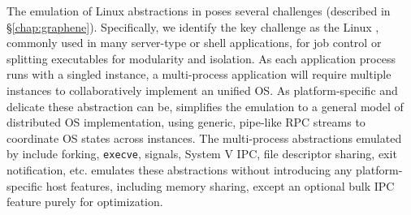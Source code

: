 %



The emulation of Linux abstractions in \graphene{}
poses several challenges (described in \S\ref{chap:graphene}).
Specifically, we identify the key challenge as the Linux ,
commonly used in many server-type or shell applications,
for job control or splitting executables for modularity and isolation.
As each application process runs with a singled \libos{} instance,
a multi-process application will require multiple \libos{} instances to collaboratively
implement an unified OS.
As platform-specific and delicate these abstraction can be,
\graphene{} simplifies the emulation to a general model of distributed OS implementation,
using generic, pipe-like RPC streams
to coordinate OS states across \libos{} instances.
The multi-process abstractions emulated by \graphene{} include
forking, {\tt execve}, signals, System V IPC, file descriptor sharing, exit notification, etc.
\graphene{} emulates these abstractions without introducing any platform-specific host features, including memory sharing,
except an optional bulk IPC feature purely for optimization.

